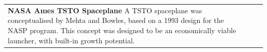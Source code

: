{\begin{landscape}
\begin{xltabular}{\linewidth}{|X|X|X|}
	\\
	\hline \small 
	\textbf{NASA Ames TSTO Spaceplane}\cite{Mehta2001}\newline\newline
	A TSTO spaceplane was conceptualised by Mehta and Bowles\cite{Mehta2001}, based on a 1993 design for the NASP program. This concept was designed to be an economically viable launcher, with built-in growth potential. 
	&\small
	

\end{xltabular}
\end{landscape}}
